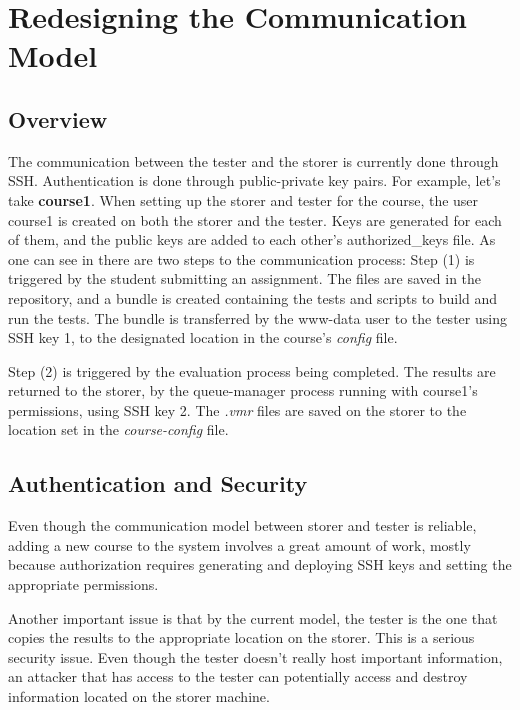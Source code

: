 \chapter{Redesigning the Communication Model}
\label{chapter:virt-comm-model}

\section{Overview}
\label{sec:vmc-overview}

The communication between the tester and the storer is currently done
through SSH. Authentication is done through public-private key pairs.
For example, let's take \textbf{course1}. When setting up the storer
and tester for the course, the user course1 is created on both the
storer and the tester. Keys are generated for each of them, and
the public keys are added to each other's authorized_keys file.
As one can see in  there are two 
steps to the communication process: Step (1) is triggered by the student
submitting an assignment. The files are saved in the repository, and a bundle
is created containing the tests and scripts to build and run the tests.
The bundle is transferred by the www-data user to the tester using SSH key 1, 
to the designated location in the course's \textit{config} file.

Step (2) is triggered by the evaluation process being completed. 
The results are returned to the storer, by the queue-manager 
process running with course1's permissions, using SSH key 2. 
The \textit{.vmr} files are saved on the storer to the location 
set in the \textit{course-config} file.

\begin{center}
\end{center}

\section{Authentication and Security}
\label{sec:vmc-auth}

Even though the communication model between storer and tester is reliable,
adding a new course to the system involves a great amount of work, mostly 
because authorization requires generating and deploying SSH keys and setting
the appropriate permissions.

Another important issue is that by the current model, the tester is the one 
that copies the results to the appropriate location on the storer. This is 
a serious security issue. Even though the tester doesn't really host important
information, an attacker that has access to the tester can potentially access 
and destroy information located on the storer machine.

